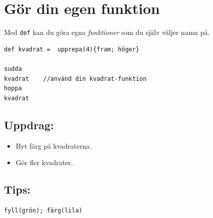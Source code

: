 \chapter{Gör din egen funktion}Med \lstinline{def} kan du göra egna {\it funktioner} som du själv väljer namn på.

\begin{lstlisting}[basicstyle={\ttfamily\fontsize{24.0}{24.0}\selectfont}]
def kvadrat =  upprepa(4){fram; höger}  

sudda
kvadrat    //använd din kvadrat-funktion
hoppa
kvadrat
\end{lstlisting}
        
\section*{\color{BrickRed}Uppdrag:}


\begin{itemize}

\item {Byt färg på kvadraterna.}
\item {Gör fler kvadrater.}

\end{itemize}


\section*{\color{OliveGreen}Tips:}

\begin{lstlisting}[]
fyll(grön); färg(lila)
\end{lstlisting}
        
